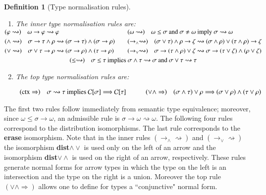\documentclass[UKenglish]{eptcs}
\newtheorem{definition}[fact]{Definition}
\newcommand{\tA}{\sigma}       \newcommand{\tB}{\tau}
\newcommand{\tC}{\rho}
\newcommand{\tD}{\zeta}
\newcommand{\tu}{\omega}
\newcommand{\tS}{\sigma}       \newcommand{\tT}{\tau}
\newcommand{\tR}{\rho}
\newcommand{\red}{\Longrightarrow}
\newcommand{\C}[1]{{\cal C}[#1]}
\newcommand{\labelx}[1]{\label{#1}}
\newcommand{\myformulaB}[1]{\\[2pt]\centerline{#1}}
\newcommand{\rr}{\Rightarrow}
\begin{document}
\begin{definition}[Type normalisation rules]\labelx{rrt}
\begin{enumerate}
\item \labelx{rrt1} The inner type normalisation rules are:\\[2pt]
$\hspace*{-8mm}\begin{array}{ll}
(\varphi\rightsquigarrow)\quad
\omega\to\varphi \rightsquigarrow\varphi & \quad
(\tu\rightsquigarrow)\quad
\omega \leq \tS \text{ and } \tS\not=\tu \text{ imply }\tS \rightsquigarrow \omega \\[1mm] (\wedge \rightsquigarrow)\quad
\tS\to\tT\wedge\tR \rightsquigarrow(\tS\to\tT)\wedge(\tS\to\tR)& \quad
(\to_\wedge\rightsquigarrow)\quad
(\tA\vee\tT)\wedge\tC \to\tD \rightsquigarrow (\tA\wedge\tC)\vee (\tB \wedge \tC)\to\tD \\[1mm] (\vee \rightsquigarrow)\quad
\tS\vee\tT\to\tR\rightsquigarrow(\tS\to\tR)\wedge(\tT\to\tR)
& \quad(\to_\vee\rightsquigarrow)\quad \tS\to (\tB\wedge\tC)\vee\tD \rightsquigarrow \tA\to(\tB\vee\tD)\wedge(\tC\vee\tD)
\\[1mm] \multicolumn{2}{c}{(\leq\rightsquigarrow)\quad
 \tS \leq  \tT\text{ implies }\tS \wedge  \tT\rightsquigarrow\tS \text{ and } \tS \vee  \tT\rightsquigarrow\tT }
\end{array}$
\item \labelx{rrt2} The top type normalisation rules are:
\myformulaB{
$\begin{array}{ll}
 (\text{ctx}\rr)\quad
 \tA \rightsquigarrow  \tB \text{ implies } \C{\tA} \red  \C{\tB} \quad & \quad (\vee\wedge\rr)\quad
 (\tA\wedge\tB) \vee\tC \red (\tA \vee \tC) \wedge (\tB\vee\tC)
\end{array}$
}
\end{enumerate}
\end{definition}
The first two rules follow immediately from semantic type equivalence; moreover, since $\omega\leq\tA\to\omega$, an admissible rule is \hbox{$\tS\to\omega \rightsquigarrow\omega$.} The following four rules correspond to the distribution isomorphisms.  The last rule corresponds to the  \textbf{erase} isomorphism.
Note that in the inner rules $(\to_\wedge\rightsquigarrow)$ and $(\to_\vee\rightsquigarrow)$ the isomorphism \mbox{\rm{\bfseries dist$\wedge\vee$}} is used only on the left of an arrow and the isomorphism \mbox{\rm{\bfseries dist$\vee \wedge$}} is used on the right of an arrow, respectively. These rules generate  normal forms for arrow types in which the type on the left is an intersection and the type on the right is a union. Moreover the top rule
$(\vee\wedge\rr)$ allows one to define for types a ``conjunctive" normal form.
\end{document}
